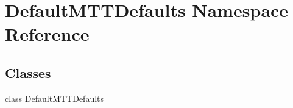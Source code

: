 \hypertarget{namespaceDefaultMTTDefaults}{\section{Default\-M\-T\-T\-Defaults Namespace Reference}
\label{namespaceDefaultMTTDefaults}
}
\subsection*{Classes}
\begin{DoxyCompactItemize}
\item 
class \hyperlink{classDefaultMTTDefaults_1_1DefaultMTTDefaults}{Default\-M\-T\-T\-Defaults}
\end{DoxyCompactItemize}
